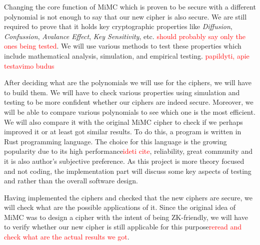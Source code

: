 \documentclass{Resources/UoBLab1}
\theoremstyle{definition}
\begin{document}
Changing the core function of MiMC which is proven to be secure with a different polynomial is not enough to say that our new cipher is also secure. We are still required to prove that it holds key cryptographic properties like \textit{Diffusion}, \textit{Confussion}, \textit{Avalance Effect}, \textit{Key Sensitivity}, etc. \textcolor{red}{should probably say only the ones being tested}. We will use various methods to test these properties which include mathematical analysis, simulation, and empirical testing. \textcolor{red}{papildyti, apie testavimo budus}

After deciding what are the polynomials we will use for the ciphers, we will have to build them. We will have to check various properties using simulation and testing to be more confident whether our ciphers are indeed secure. Moreover, we will be able to compare various polynomials to see which one is the most efficient. We will also compare it with the original MiMC cipher to check if we perhaps improved it or at least got similar results. To do this, a program is written in Rust programming language. The choice for this language is the growing popularity due to its high performance\textcolor{red}{ideti cite}, reliability, great community and it is also author's subjective preference. As this project is more theory focused and not coding, the implementation part will discuss some key aspects of testing and rather than the overall software design.

Having implemented the ciphers and checked that the new ciphers are secure, we will check what are the possible applications of it. Since the original idea of MiMC was to design a cipher with the intent of being ZK-friendly, we will have to verify whether our new cipher is still applicable for this purpose\textcolor{red}{reread and check what are the actual results we got}.


\end{document}
